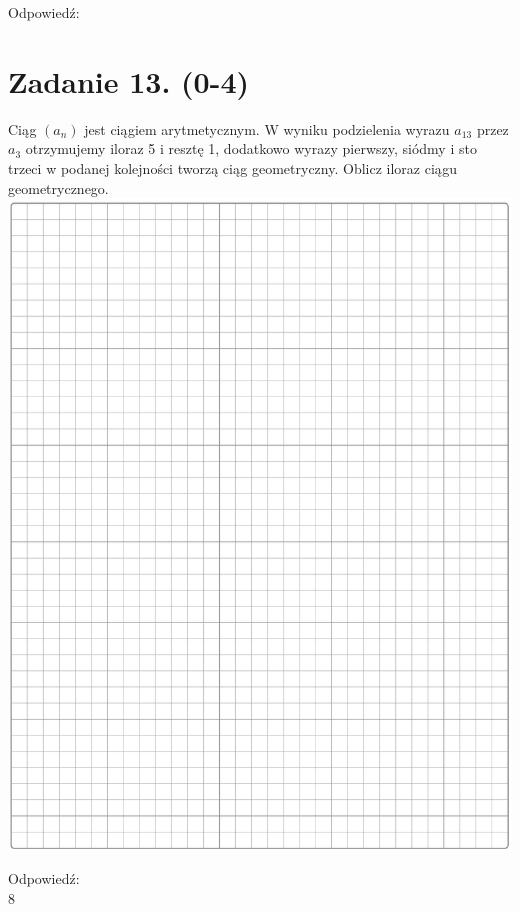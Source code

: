 \documentclass[10pt]{article}
\begin{document}
Odpowiedź: \(\qquad\)

\section*{Zadanie 13. (0-4)}
Ciąg \(\left(a_{n}\right)\) jest ciągiem arytmetycznym. W wyniku podzielenia wyrazu \(a_{13}\) przez \(a_{3}\) otrzymujemy iloraz 5 i resztę 1, dodatkowo wyrazy pierwszy, siódmy i sto trzeci w podanej kolejności tworzą ciąg geometryczny. Oblicz iloraz ciągu geometrycznego.\\
\includegraphics[max width=\textwidth, center]{2024_11_21_599d917d55a506aace4bg-08}

Odpowiedź:\\
8
\end{document}
